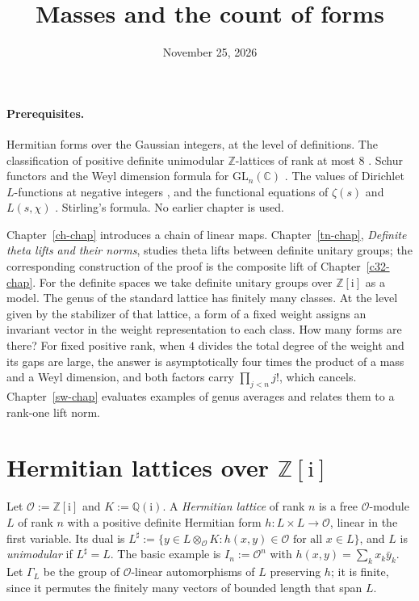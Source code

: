 \documentclass[reqno]{amsart}
\title{Masses and the count of forms}
\author{}
\date{November 25, 2026}
\newcounter{chap}
\theoremstyle{definition}
\theoremstyle{plain}
\newcommand{\Z}{\mathbb{Z}}
\newcommand{\Q}{\mathbb{Q}}
\newcommand{\C}{\mathbb{C}}
\newcommand{\ii}{\mathrm{i}}
\newcommand{\Oc}{\mathcal{O}}
\begin{document}
\maketitle
{}\label{chap}

\paragraph{Prerequisites.}
Hermitian forms over the Gaussian integers, at the level of definitions.  The classification of positive definite unimodular \(\Z\)-lattices of rank at most \(8\) \cite[Ch.~16]{CoS}.  Schur functors and the Weyl dimension formula for \(\mathrm{GL}_n(\C)\) \cite[Theorem~6.3 and Eq.~(15.17)]{FH}.  The values of Dirichlet \(L\)-functions at negative integers \cite[Theorem~4.2]{Wa}, and the functional equations of \(\zeta(s)\) and \(L(s,\chi)\) \cite[Ch.~8, 9]{Dav}.  Stirling's formula.  No earlier chapter is used.

Chapter~\ref{ch-chap} introduces a chain of linear maps.  Chapter~\ref{tn-chap}, \emph{Definite theta lifts and their norms}, studies theta lifts between definite unitary groups; the corresponding construction of the proof is the composite lift of Chapter~\ref{c32-chap}.  For the definite spaces we take definite unitary groups over \(\Z[\ii]\) as a model.  The genus of the standard lattice has finitely many classes.  At the level given by the stabilizer of that lattice, a form of a fixed weight assigns an invariant vector in the weight representation to each class.  How many forms are there?  For fixed positive rank, when \(4\) divides the total degree of the weight and its gaps are large, the answer is asymptotically four times the product of a mass and a Weyl dimension, and both factors carry \(\prod_{j<n} j!\), which cancels.  Chapter~\ref{sw-chap} evaluates examples of genus averages and relates them to a rank-one lift norm.

\section{Hermitian lattices over \texorpdfstring{\(\Z[\ii]\)}{Z[i]}}\label{sec:lattices}

Let \(\Oc := \Z[\ii]\) and \(K := \Q(\ii)\).  A \emph{Hermitian lattice} of rank \(n\) is a free \(\Oc\)-module \(L\) of rank \(n\) with a positive definite Hermitian form \(h \colon L \times L \to \Oc\), linear in the first variable.  Its dual is \(L^\sharp := \{y \in L \otimes_\Oc K : h(x,y) \in \Oc \text{ for all } x \in L\}\), and \(L\) is \emph{unimodular} if \(L^\sharp = L\).  The basic example is \(I_n := \Oc^n\) with \(h(x,y) = \sum_k x_k \bar y_k\).  Let \(\Gamma_L\) be the group of \(\Oc\)-linear automorphisms of \(L\) preserving \(h\); it is finite, since it permutes the finitely many vectors of bounded length that span \(L\).
\end{document}
